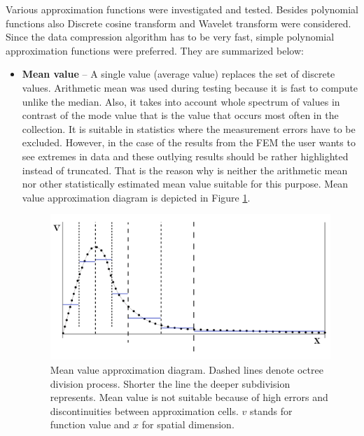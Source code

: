 Various approximation functions were investigated and tested. Besides polynomial functions also Discrete cosine transform \cite{XXX-13} and Wavelet transform \cite{XXX-14} were considered. Since the data compression algorithm has to be very fast, simple polynomial approximation functions were preferred. They are summarized below:

\begin{itemize}
  \item \textbf{Mean value} -- A single value (average value) replaces the set of discrete values. Arithmetic mean was used during testing because it is fast to compute unlike the median. Also, it takes into account whole spectrum of values in contrast of the mode value that is the value that occurs most often in the collection. It is suitable in statistics where the measurement errors have to be excluded. However, in the case of the results from the FEM the user wants to see extremes in data and these outlying results should be rather highlighted instead of truncated. That is the reason why is neither the arithmetic mean nor other statistically estimated mean value suitable for this purpose. Mean value approximation diagram is depicted in Figure \ref{fig:mean-value-approx}.

  \begin{figure}[H]
  \centering
  \includegraphics[width=\textwidth]{figures/appendix-approximation/figure4}
  \decoRule
  \caption[Mean value approximation diagram]{Mean value approximation diagram. Dashed lines denote octree division process. Shorter the line the deeper subdivision represents. Mean value is not suitable because of high errors and discontinuities between approximation cells. $v$ stands for function value and $x$ for spatial dimension.}
  \label{fig:mean-value-approx}
  \end{figure}


\end{itemize}
